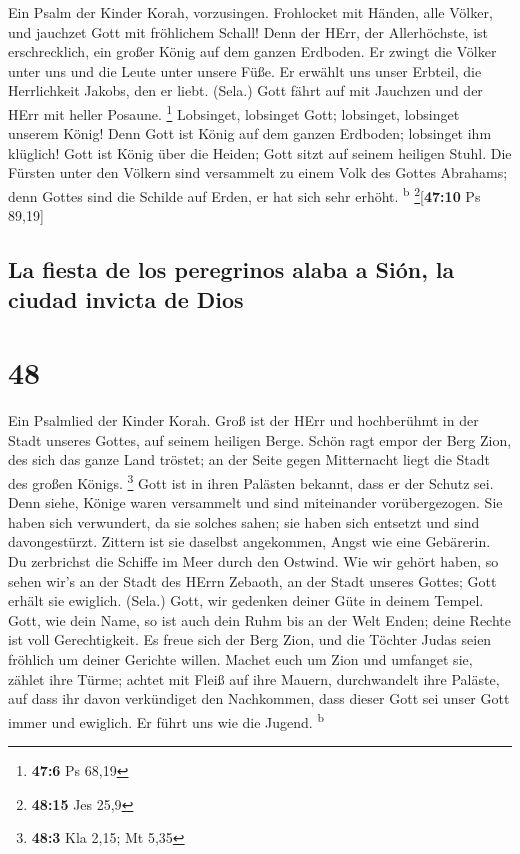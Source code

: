  Ein Psalm der Kinder Korah, vorzusingen. 
Frohlocket mit Händen, alle Völker, und jauchzet Gott mit fröhlichem
Schall!  Denn der HErr, der Allerhöchste, ist
erschrecklich, ein großer König auf dem ganzen Erdboden. 
Er zwingt die Völker unter uns und die Leute unter unsere Füße.
 Er erwählt uns unser Erbteil, die Herrlichkeit Jakobs,
den er liebt. (Sela.)  Gott fährt auf mit Jauchzen und der
HErr mit heller Posaune. \footnote{\textbf{47:6} Ps 68,19}
 Lobsinget, lobsinget Gott; lobsinget, lobsinget unserem
König!  Denn Gott ist König auf dem ganzen Erdboden;
lobsinget ihm klüglich!  Gott ist König über die Heiden;
Gott sitzt auf seinem heiligen Stuhl.  Die Fürsten unter
den Völkern sind versammelt zu einem Volk des Gottes Abrahams; denn
Gottes sind die Schilde auf Erden, er hat sich sehr erhöht.
\textsuperscript{b} \footnote{\textbf{48:15} Jes 25,9}{[}\textbf{47:10}
Ps 89,19{]}

\hypertarget{la-fiesta-de-los-peregrinos-alaba-a-siuxf3n-la-ciudad-invicta-de-dios}{%
\subsection{La fiesta de los peregrinos alaba a Sión, la ciudad invicta
de
Dios}\label{la-fiesta-de-los-peregrinos-alaba-a-siuxf3n-la-ciudad-invicta-de-dios}}

\hypertarget{section-47}{%
\section{48}\label{section-47}}

 Ein Psalmlied der Kinder Korah.  Groß ist
der HErr und hochberühmt in der Stadt unseres Gottes, auf seinem
heiligen Berge.  Schön ragt empor der Berg Zion, des sich
das ganze Land tröstet; an der Seite gegen Mitternacht liegt die Stadt
des großen Königs. \footnote{\textbf{48:3} Kla 2,15; Mt 5,35}
 Gott ist in ihren Palästen bekannt, dass er der Schutz
sei.  Denn siehe, Könige waren versammelt und sind
miteinander vorübergezogen.  Sie haben sich verwundert, da
sie solches sahen; sie haben sich entsetzt und sind davongestürzt.
 Zittern ist sie daselbst angekommen, Angst wie eine
Gebärerin.  Du zerbrichst die Schiffe im Meer durch den
Ostwind.  Wie wir gehört haben, so sehen wir's an der
Stadt des HErrn Zebaoth, an der Stadt unseres Gottes; Gott erhält sie
ewiglich. (Sela.)  Gott, wir gedenken deiner Güte in
deinem Tempel.  Gott, wie dein Name, so ist auch dein
Ruhm bis an der Welt Enden; deine Rechte ist voll Gerechtigkeit.
 Es freue sich der Berg Zion, und die Töchter Judas seien
fröhlich um deiner Gerichte willen.  Machet euch um Zion
und umfanget sie, zählet ihre Türme;  achtet mit Fleiß
auf ihre Mauern, durchwandelt ihre Paläste, auf dass ihr davon
verkündiget den Nachkommen,  dass dieser Gott sei unser
Gott immer und ewiglich. Er führt uns wie die Jugend.
\textsuperscript{b}

